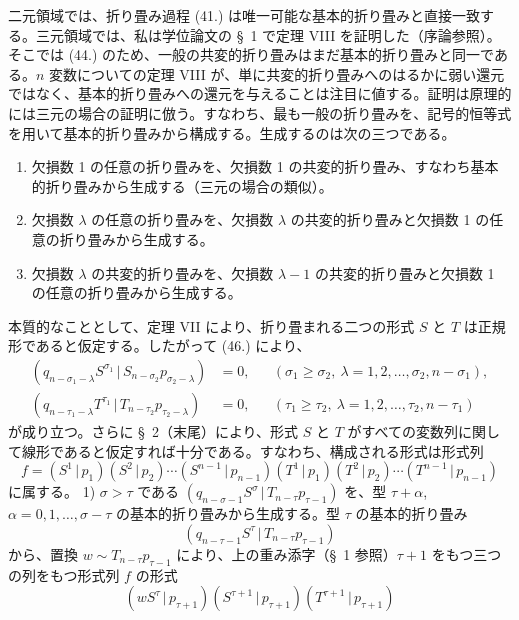 \documentclass[11pt]{jlreq}
\newcommand{\pair}[2]{(#1\,|\,#2)}
\begin{document}
二元領域では、折り畳み過程 (41.) は唯一可能な基本的折り畳みと直接一致する。三元領域では、私は学位論文の \S\ 1 で定理 VIII を証明した（序論参照）。そこでは (44.) のため、一般の共変的折り畳みはまだ基本的折り畳みと同一である。$n$ 変数についての定理 VIII が、単に共変的折り畳みへのはるかに弱い還元ではなく、基本的折り畳みへの還元を与えることは注目に値する。証明は原理的には三元の場合の証明に倣う。すなわち、最も一般の折り畳みを、記号的恒等式を用いて基本的折り畳みから構成する。生成するのは次の三つである。
\begin{enumerate}
\item 欠損数 1 の任意の折り畳みを、欠損数 1 の共変的折り畳み、すなわち基本的折り畳みから生成する（三元の場合の類似）。
\item 欠損数 $\lambda$ の任意の折り畳みを、欠損数 $\lambda$ の共変的折り畳みと欠損数 1 の任意の折り畳みから生成する。
\item 欠損数 $\lambda$ の共変的折り畳みを、欠損数 $\lambda-1$ の共変的折り畳みと欠損数 1 の任意の折り畳みから生成する。
\end{enumerate}
本質的なこととして、定理 VII により、折り畳まれる二つの形式 $S$ と $T$ は正規形であると仮定する。したがって (46.) により、
\begin{equation}
\begin{aligned}
\pair{q_{n-\sigma_1-\lambda}S^{\sigma_1}}{S_{n-\sigma_2}p_{\sigma_2-\lambda}}&=0,
&& (\sigma_1\ge\sigma_2,\ \lambda=1,2,\ldots,\sigma_2,n-\sigma_1),\\
\pair{q_{n-\tau_1-\lambda}T^{\tau_1}}{T_{n-\tau_2}p_{\tau_2-\lambda}}&=0,
&& (\tau_1\ge\tau_2,\ \lambda=1,2,\ldots,\tau_2,n-\tau_1)
\end{aligned}
\tag{62}
\end{equation}
が成り立つ。さらに \S\ 2（末尾）により、形式 $S$ と $T$ がすべての変数列に関して線形であると仮定すれば十分である。すなわち、構成される形式は形式列
\[
 f=\pair{S^1}{p_1}\pair{S^2}{p_2}\cdots\pair{S^{n-1}}{p_{n-1}}
   \pair{T^1}{p_1}\pair{T^2}{p_2}\cdots\pair{T^{n-1}}{p_{n-1}}
\]
に属する。
1) $\sigma>\tau$ である $\pair{q_{n-\sigma-1}S^\sigma}{T_{n-\tau}p_{\tau-1}}$ を、型 $\tau+\alpha$, $\alpha=0,1,\ldots,\sigma-\tau$ の基本的折り畳みから生成する。型 $\tau$ の基本的折り畳み
\[
 \pair{q_{n-\tau-1}S^\tau}{T_{n-\tau}p_{\tau-1}}
\]
から、置換 $w\sim T_{n-\tau}p_{\tau-1}$ により、上の重み添字（\S\ 1 参照）$\tau+1$ をもつ三つの列をもつ形式列 $f$ の形式
\begin{equation}
 \pair{wS^\tau}{p_{\tau+1}}\pair{S^{\tau+1}}{p_{\tau+1}}\pair{T^{\tau+1}}{p_{\tau+1}}
\tag{63}
\end{equation}
\end{document}
